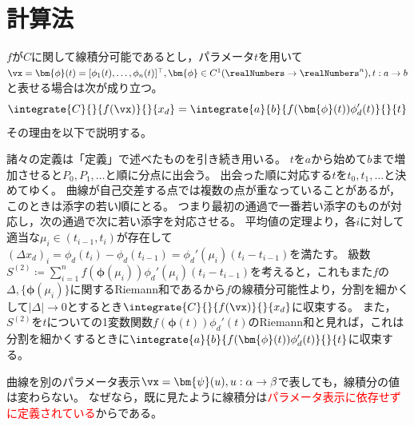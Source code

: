     \section{計算法}
        $f$が$C$に関して線積分可能であるとし，パラメータ$t$を用いて$\vx=\bm{\phi}(t)=[\phi_1(t),\dotsc,\phi_n(t)]^\top, \bm{\phi} \in C^1(\realNumbers\to\realNumbers^n),t:a\to b$と表せる場合は次が成り立つ。
        \[ \integrate{C}{}{f(\vx)}{}{x_d} = \integrate{a}{b}{f(\bm{\phi}(t))\phi_d'(t)}{}{t} \]
        その理由を以下で説明する。
        \par
        諸々の定義は「定義」で述べたものを引き続き用いる。
        $t$を$a$から始めて$b$まで増加させると$P_0,P_1,\dotsc$と順に分点に出会う。
        出会った順に対応する$t$を$t_0,t_1,\dotsc$と決めてゆく。
        曲線が自己交差する点では複数の点が重なっていることがあるが，このときは添字の若い順にとる。
        つまり最初の通過で一番若い添字のものが対応し，次の通過で次に若い添字を対応させる。
        平均値の定理より，各$i$に対して適当な$\mu_i\in(t_{i-1},t_i)$が存在して$(\Delta x_d)_i = \phi_d(t_i) - \phi_d(t_{i-1}) = \phi_d'(\mu_i)(t_i-t_{i-1})$を満たす。
        級数$S^{(2)} \coloneq \sum_{i=1}^n f(\bm{\phi}(\mu_i))\phi_d'(\mu_i)(t_i-t_{i-1})$を考えると，これもまた$f$の$\Delta, \{\bm{\phi}(\mu_i)\}$に関するRiemann和であるから$f$の線積分可能性より，分割を細かくして$|\Delta|\to 0$とするとき$\integrate{C}{}{f(\vx)}{}{x_d}$に収束する。
        また，$S^{(2)}$を$t$についての1変数関数$f(\bm{\phi}(t))\phi_d'(t)$のRiemann和と見れば，これは分割を細かくするときに$\integrate{a}{b}{f(\bm{\phi}(t))\phi_d'(t)}{}{t}$に収束する。
        \newline
        \par
        曲線を別のパラメータ表示$\vx = \bm{\psi}(u), u:\alpha\to\beta$で表しても，線積分の値は変わらない。
        なぜなら，既に見たように線積分は\textcolor{red}{パラメータ表示に依存せずに定義されている}からである。
